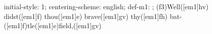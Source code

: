 initial-style: 1;
centering-scheme: english;
def-m1: \grealign;
(f3)Well([em1]hv) didst([em1]f) thou([em1]e) brave([em1]gv) thy([em1]fh) bat-([em1]f)tle([em1]e)field,([em1]gv)
